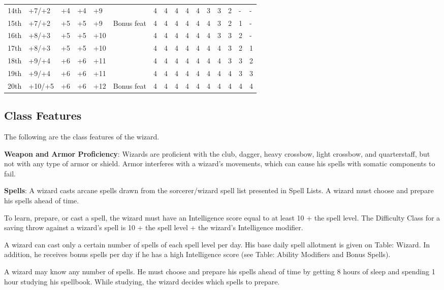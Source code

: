 \begin{table*}[]
\begin{tabularx}{\linewidth}{lp{6em}p{2.5em}p{2.5em}p{2.5em}Xllllllllll}
14th & +7/+2 & +4 & +4 & +9 &  & 4 & 4 & 4 & 4 & 4 & 3 & 3 & 2 & - & -\\
15th & +7/+2 & +5 & +5 & +9 & Bonus feat & 4 & 4 & 4 & 4 & 4 & 4 & 3 & 2 & 1 & -\\
16th & +8/+3 & +5 & +5 & +10 &  & 4 & 4 & 4 & 4 & 4 & 4 & 3 & 3 & 2 & -\\
17th & +8/+3 & +5 & +5 & +10 &  & 4 & 4 & 4 & 4 & 4 & 4 & 4 & 3 & 2 & 1\\
18th & +9/+4 & +6 & +6 & +11 &  & 4 & 4 & 4 & 4 & 4 & 4 & 4 & 3 & 3 & 2\\
19th & +9/+4 & +6 & +6 & +11 &  & 4 & 4 & 4 & 4 & 4 & 4 & 4 & 4 & 3 & 3\\
20th & +10/+5 & +6 & +6 & +12 & Bonus feat & 4 & 4 & 4 & 4 & 4 & 4 & 4 & 4 & 4 & 4\\
\end{tabularx}
\end{table*}
				
\subsection{Class Features}

				
The following are the class features of the wizard.
				
\textbf{Weapon and Armor Proficiency}: Wizards are proficient with the club, dagger, heavy crossbow, light crossbow, and quarterstaff, but not with any type of armor or shield. Armor interferes with a wizard's movements, which can cause his spells with somatic components to fail.
				
\textbf{Spells}: A wizard casts arcane spells drawn from the sorcerer/wizard spell list presented in Spell Lists. A wizard must choose and prepare his spells ahead of time.
				
To learn, prepare, or cast a spell, the wizard must have an Intelligence score equal to at least 10 + the spell level. The Difficulty Class for a saving throw against a wizard's spell is 10 + the spell level + the wizard's Intelligence modifier.
				
A wizard can cast only a certain number of spells of each spell level per day. His base daily spell allotment is given on Table: Wizard. In addition, he receives bonus spells per day if he has a high Intelligence score (see Table: Ability Modifiers and Bonus Spells).
				
A wizard may know any number of spells. He must choose and prepare his spells ahead of time by getting 8 hours of sleep and spending 1 hour studying his spellbook. While studying, the wizard decides which spells to prepare.
				
